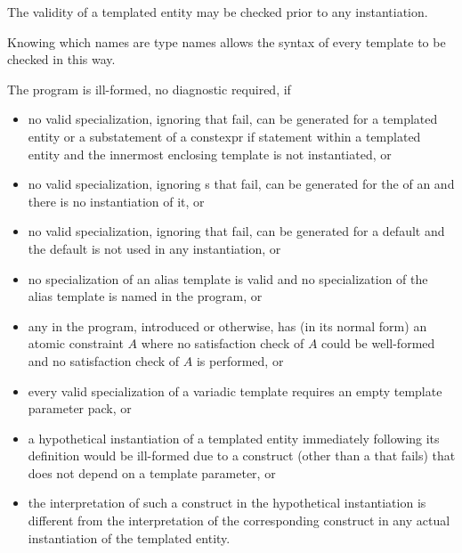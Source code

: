 \pnum
{}%
%
The validity of a templated entity may be checked prior to any instantiation.
\begin{note}
Knowing which names are type names allows the syntax of every template
to be checked in this way.
\end{note}
The program is ill-formed, no diagnostic required, if
\begin{itemize}
\item
no valid specialization,
ignoring  that fail,
can be generated for a templated entity
or a substatement of a constexpr if statement
within a templated entity
and the innermost enclosing template is not instantiated, or
\item
no valid specialization,
ignoring s that fail,
can be generated for the 
of an  and there is no instantiation of it, or
\item
no valid specialization,
ignoring  that fail,
can be generated for a default  and
the default  is not used in any instantiation, or
\item
no specialization of an alias template is valid and
no specialization of the alias template is named in the program, or
\item
any  in the program, introduced or otherwise,
has (in its normal form) an atomic constraint $A$ where
no satisfaction check of $A$ could be well-formed and
no satisfaction check of $A$ is performed, or
\item
every valid specialization of a variadic template requires an empty template
parameter pack, or
\item
a hypothetical instantiation of a templated entity
immediately following its definition
would be ill-formed
due to a construct
(other than a  that fails)
that does not depend on a template parameter, or
\item
the interpretation of such a construct
in the hypothetical instantiation
is different from
the interpretation of the corresponding construct
in any actual instantiation of the templated entity.
\end{itemize}
